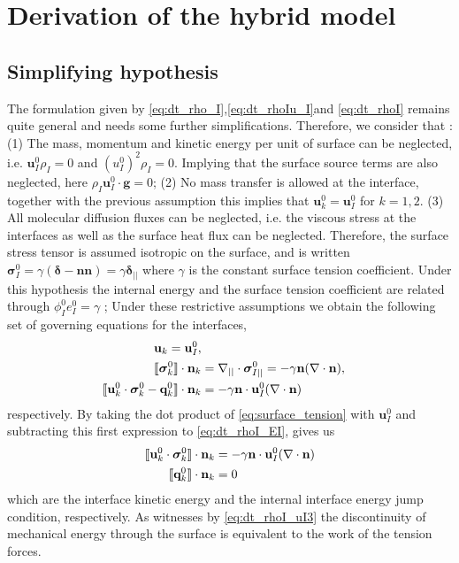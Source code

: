 \section{Derivation of the hybrid model}

\subsection{Simplifying hypothesis}
\label{ap:hypothesis}

The formulation given by \ref{eq:dt_rho_I},\ref{eq:dt_rhoIu_I}and \ref{eq:dt_rhoI} remains quite general and needs some further simplifications. 
Therefore, we consider that :
(1) The mass, momentum and kinetic energy per unit of surface can be neglected, i.e. $\textbf{u}_I^0\rho_I = 0 $ and $(u_I^0)^2\rho_I = 0$. 
Implying that the surface source terms are also neglected, here $\rho_I \textbf{u}_I^0\cdot \textbf{g} = 0$; 
(2) No mass transfer is allowed at the interface, together with the previous assumption this implies that $\textbf{u}_k^0 = \textbf{u}_I^0$ for $k = 1,2$. 
(3) All molecular diffusion fluxes can be neglected, i.e. the viscous stress at the interfaces as well as the surface heat flux can be neglected.
Therefore, the surface stress tensor is assumed isotropic on the surface, and is written $\bm{\sigma}_I^0  = \gamma (\bm\delta - \textbf{nn}) = \gamma \bm\delta_{||}$ where $\gamma$ is the constant surface tension coefficient.
Under this hypothesis the internal energy and the surface tension coefficient are related through $\phi_I^0 e_I^0 = \gamma$ \cite{ishii2010thermo};
Under these restrictive assumptions we obtain the following set of governing equations for the interfaces,
\begin{align}
    \label{eq:dt_rho_I}
    \textbf{u}_k = \textbf{u}_I^0, \\
    \llbracket \bm{\sigma}_k^0 \rrbracket \cdot \textbf{n}_k 
    &=
    \mathbf{\nabla}_{||}\cdot\bm\sigma^0_{I||}
    =
    -\gamma\textbf{n}(\mathbf{\nabla}\cdot \textbf{n}),
    \label{eq:surface_tension}\\
    \label{eq:dt_rhoI_EI}
    \llbracket \textbf{u}_k^0 \cdot \bm{\sigma}_k^0 - \textbf{q}_k^0 \rrbracket \cdot \textbf{n}_k
    &=
    -\gamma\textbf{n}\cdot \textbf{u}_{I}^0(\mathbf{\nabla}\cdot \textbf{n})
\end{align}
respectively. 
By taking the dot product of \ref{eq:surface_tension} with $\textbf{u}_I^0$ and subtracting this first expression to \ref{eq:dt_rhoI_EI}, gives us
\begin{align}
    \label{eq:dt_rhoI_uI3}
    \llbracket \textbf{u}_k^0 \cdot \bm{\sigma}_k^0 \rrbracket \cdot \textbf{n}_k
    &=
    -\gamma\textbf{n}\cdot \textbf{u}_{I}^0(\mathbf{\nabla}\cdot \textbf{n})\\
    \label{eq:dt_rhoIe_I}
    \llbracket  \textbf{q}_k^0 \rrbracket \cdot \textbf{n}_k
    &= 
     0
\end{align}
which are the interface kinetic energy and the internal interface energy jump condition, respectively. 
As witnesses by \ref{eq:dt_rhoI_uI3} the discontinuity of mechanical energy through the surface is equivalent to the work of the tension forces. 
